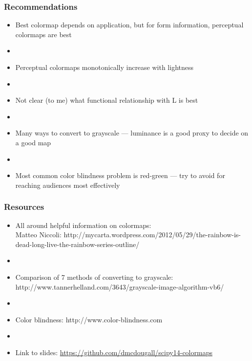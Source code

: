 \documentclass[ignorenonframetext]{beamer}
\begin{document}
\begin{frame}[c]\frametitle{Recommendations}
\begin{itemize}
    \item Best colormap depends on application, but for form information, perceptual colormaps are best
    \item[] ~
    \item Perceptual colormaps monotonically increase with lightness
    \item[] ~
    \item Not clear (to me) what functional relationship with L is best
    \item[] ~
    \item Many ways to convert to grayscale --- luminance is a good proxy to decide on a good map
    \item[] ~
    \item Most common color blindness problem is red-green --- try to avoid for reaching audiences most effectively
\end{itemize}
\end{frame}

\begin{frame}[c]\frametitle{Resources}
\begin{itemize}
    \item[] All around helpful information on colormaps: \\Matteo Niccoli: http://mycarta.wordpress.com/2012/05/29/the-rainbow-is-dead-long-live-the-rainbow-series-outline/
    \item[] ~
    \item[] Comparison of 7 methods of converting to grayscale: http://www.tannerhelland.com/3643/grayscale-image-algorithm-vb6/
    \item[] ~
    \item[] Color blindness: http://www.color-blindness.com
    \item[] ~
    \item[] Link to slides:  \url{https://github.com/dmcdougall/scipy14-colormaps}
\end{itemize}
\end{frame}
\end{document}
